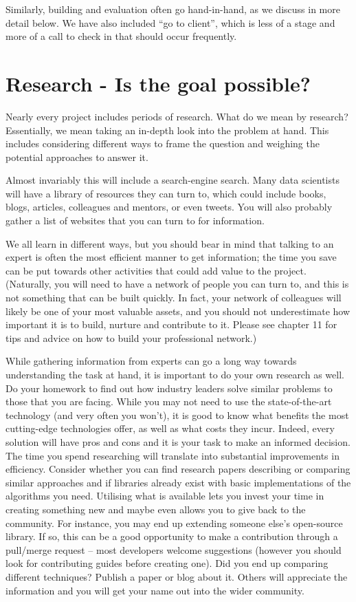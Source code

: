 \documentclass[
]{book}
\begin{document}
Similarly, building and evaluation often go hand-in-hand, as we discuss in more detail below. We have also included ``go to client'', which is less of a stage and more of a call to check in that should occur frequently.

\hypertarget{research---is-the-goal-possible}{%
\section{Research - Is the goal possible?}\label{research---is-the-goal-possible}}

Nearly every project includes periods of research. What do we mean by research? Essentially, we mean taking an in-depth look into the problem at hand. This includes considering different ways to frame the question and weighing the potential approaches to answer it.

Almost invariably this will include a search-engine search. Many data scientists will have a library of resources they can turn to, which could include books, blogs, articles, colleagues and mentors, or even tweets. You will also probably gather a list of websites that you can turn to for information.

We all learn in different ways, but you should bear in mind that talking to an expert is often the most efficient manner to get information; the time you save can be put towards other activities that could add value to the project. (Naturally, you will need to have a network of people you can turn to, and this is not something that can be built quickly. In fact, your network of colleagues will likely be one of your most valuable assets, and you should not underestimate how important it is to build, nurture and contribute to it. Please see chapter 11 for tips and advice on how to build your professional network.)

While gathering information from experts can go a long way towards understanding the task at hand, it is important to do your own research as well. Do your homework to find out how industry leaders solve similar problems to those that you are facing. While you may not need to use the state-of-the-art technology (and very often you won't), it is good to know what benefits the most cutting-edge technologies offer, as well as what costs they incur. Indeed, every solution will have pros and cons and it is your task to make an informed decision. The time you spend researching will translate into substantial improvements in efficiency. Consider whether you can find research papers describing or comparing similar approaches and if libraries already exist with basic implementations of the algorithms you need. Utilising what is available lets you invest your time in creating something new and maybe even allows you to give back to the community. For instance, you may end up extending someone else's open-source library. If so, this can be a good opportunity to make a contribution through a pull/merge request -- most developers welcome suggestions (however you should look for contributing guides before creating one). Did you end up comparing different techniques? Publish a paper or blog about it. Others will appreciate the information and you will get your name out into the wider community.
\end{document}

